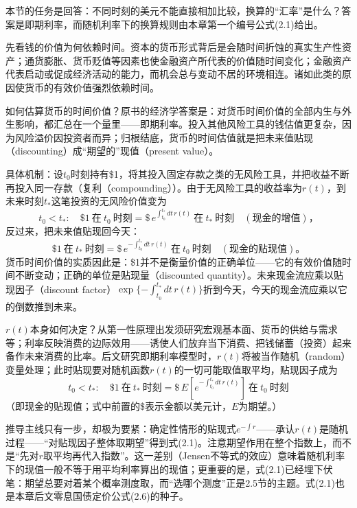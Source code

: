 本节的任务是回答：不同时刻的美元不能直接相加比较，换算的“汇率”是什么？答案是即期利率，而随机利率下的换算规则由本章第一个编号公式(2.1)给出。

先看钱的价值为何依赖时间。资本的货币形式背后是会随时间折蚀的真实生产性资产；通货膨胀、货币贬值等因素也使金融资产所代表的价值随时间变化；金融资产代表启动或促成经济活动的能力，而机会总与变动不居的环境相连。诸如此类的原因使货币的有效价值强烈依赖时间。

如何估算货币的时间价值？原书的经济学答案是：对货币时间价值的全部内生与外生影响，都汇总在一个量里——即期利率。投入其他风险工具的钱估值更复杂，因为风险溢价因投资者而异；归根结底，货币的时间估值就是把未来值贴现（discounting）成“期望的”现值（present value）。

具体机制：设$t_0$时刻持有\$1，将其投入固定存款之类的无风险工具，并把收益不断再投入同一存款（复利（compounding））。由于无风险工具的收益率为$r(t)$，到未来时刻$t_*$这笔投资的无风险价值变为
\begin{equation*}
t_0<t_*:\quad \$1\ \text{在}\ t_0\ \text{时刻}
=\$\,e^{\int_{t_0}^{t_*}dt\,r(t)}\ \text{在}\ t_*\ \text{时刻}\quad(\text{现金的增值})，
\end{equation*}
反过来，把未来值贴现回今天：
\begin{equation*}
\$1\ \text{在}\ t_*\ \text{时刻}
=\$\,e^{-\int_{t_0}^{t_*}dt\,r(t)}\ \text{在}\ t_0\ \text{时刻}\quad(\text{现金的贴现值})。
\end{equation*}
货币时间价值的实质因此是：\$1并不是衡量价值的正确单位——它的有效价值随时间不断变动；正确的单位是贴现量（discounted quantity）。未来现金流应乘以贴现因子（discount factor）$\exp\{-\int_{t_0}^{t_*}dt\,r(t)\}$折到今天，今天的现金流应乘以它的倒数推到未来。

$r(t)$本身如何决定？从第一性原理出发须研究宏观基本面、货币的供给与需求等；利率反映消费的边际效用——诱使人们放弃当下消费、把钱储蓄（投资）起来备作未来消费的比率。后文研究即期利率模型时，$r(t)$将被当作随机（random）变量处理；此时贴现要对随机函数$r(t)$的一切可能取值取平均，贴现因子成为
\begin{equation*}
t_0<t_*:\quad \$1\ \text{在}\ t_*\ \text{时刻}
=\$\,E\!\left[e^{-\int_{t_0}^{t_*}dt\,r(t)}\right]\ \text{在}\ t_0\ \text{时刻}
\tag{2.1}
\end{equation*}
（即现金的贴现值；式中前置的\$表示金额以美元计，$E$为期望。）

推导主线只有一步，却极为要紧：确定性情形的贴现式$e^{-\int r}$——承认$r(t)$是随机过程——“对贴现因子整体取期望”得到式(2.1)。注意期望作用在整个指数上，而不是“先对$r$取平均再代入指数”。这一差别（Jensen不等式的效应）意味着随机利率下的现值一般不等于用平均利率算出的现值；更重要的是，式(2.1)已经埋下伏笔：期望总要对着某个概率测度取，而“选哪个测度”正是2.5节的主题。式(2.1)也是本章后文零息国债定价公式(2.6)的种子。


